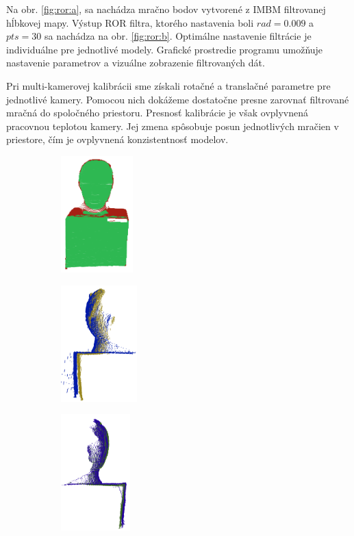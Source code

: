 Na obr. \ref{fig:ror:a}, sa nachádza mračno bodov vytvorené z IMBM filtrovanej hĺbkovej mapy. Výstup ROR filtra, ktorého nastavenia boli $rad=0.009$ a $pts=30$ sa nachádza na obr. \ref{fig:ror:b}. Optimálne nastavenie filtrácie je individuálne pre jednotlivé modely. Grafické prostredie programu umožňuje nastavenie parametrov a vizuálne zobrazenie filtrovaných dát. 

Pri multi-kamerovej kalibrácii sme získali rotačné a translačné parametre pre jednotlivé kamery. Pomocou nich dokážeme dostatočne presne zarovnať filtrované mračná do spoločného priestoru. Presnosť kalibrácie je však ovplyvnená pracovnou teplotou kamery. Jej zmena spôsobuje posun jednotlivých mračien v priestore, čím je ovplyvnená konzistentnosť modelov.

\begin{figure}[h]
	\centering
	\begin{subfigure}[b]{0.32\textwidth}
		\centering
		\includegraphics[height=4.5cm]{figures/icp1.png}
		\caption{}
		\label{fig:icp:a}
	\end{subfigure}
	\hfill
	\begin{subfigure}[b]{0.32\textwidth}
		\centering
		\includegraphics[height=4.5cm]{figures/icp0.png}
		\caption{}
		\label{fig:icp:b}
	\end{subfigure}
	\hfill
	\begin{subfigure}[b]{0.32\textwidth}
		\centering
		\includegraphics[height=4.5cm]{figures/icp2.png}

\end{subfigure}
\end{figure}
